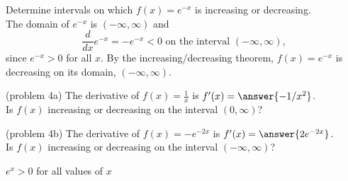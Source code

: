 \documentclass[handout]{ximera}
\begin{document}
\begin{example}[example 4]
Determine intervals on which $f(x) = e^{-x}$ is increasing or decreasing.\\
The domain of $e^{-x}$ is $(-\infty,\infty)$ and 
\[
\frac{d}{dx} e^{-x} = -e^{-x} < 0 \text{ on the interval } (-\infty, \infty),
\]
since $e^{-x} > 0$ for all $x$. By the increasing/decreasing theorem, $f(x) = e^{-x}$ is 
decreasing on its domain, $(-\infty, \infty)$.

\begin{image}
\end{image}

\end{example}



\begin{problem}(problem 4a)
The derivative of $f(x)=\frac{1}{x}$ is $f'(x) = \answer{-1/x^2}$.\\
Is $f(x)$ increasing or decreasing on the interval $(0, \infty)$?
\begin{multipleChoice}
\end{multipleChoice}
\end{problem}



\begin{problem}(problem 4b)
The derivative of $f(x) = -e^{-2x}$ is $f'(x) = \answer{2e^{-2x}}$.\\
Is $f(x)$ increasing or decreasing on the interval $(-\infty, \infty)$?
\begin{hint}
$e^x > 0$ for all values of $x$
\end{hint}
\begin{multipleChoice}
\end{multipleChoice}
\end{problem}
\end{document}
